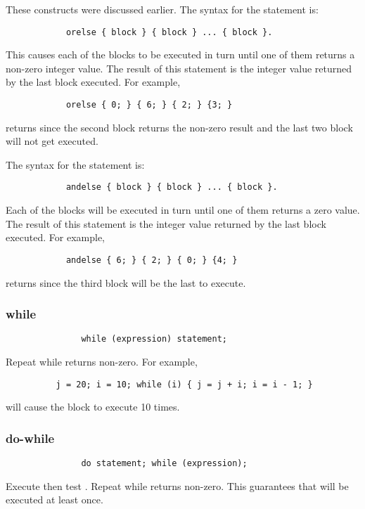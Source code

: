         These constructs were discussed earlier.  The syntax for the
         statement is:
\begin{verbatim}        
            orelse { block } { block } ... { block }.
\end{verbatim}
        This causes each of the blocks to be executed in turn until one of
        them returns a non-zero integer value.  The result of this statement
        is the integer value returned by the last block executed.  For
        example,
\begin{verbatim}
            orelse { 0; } { 6; } { 2; } {3; }
\end{verbatim}
        returns  since the second block returns the non-zero result 
        and the last two block will not get executed.

        The syntax for the  statement is:
\begin{verbatim}
            andelse { block } { block } ... { block }.
\end{verbatim}
        Each of the blocks will be executed in turn until one of
        them returns a zero value.  The result of this statement is the
        integer value returned by the last block executed.  For example,
\begin{verbatim}        
            andelse { 6; } { 2; } { 0; } {4; }
\end{verbatim}
        returns  since the third block will be the last to execute.

     
\subsubsection{while}
\begin{verbatim}   
               while (expression) statement;
\end{verbatim}
       Repeat  while  returns non-zero.  For example, 
\begin{verbatim}
          j = 20; i = 10; while (i) { j = j + i; i = i - 1; }
\end{verbatim}
       will cause the block to execute 10 times.
        
\subsubsection{do-while}
\begin{verbatim}   
               do statement; while (expression);
\end{verbatim}
        Execute  then test .  Repeat while
         returns non-zero.  This guarantees that
         will be executed at least once.

